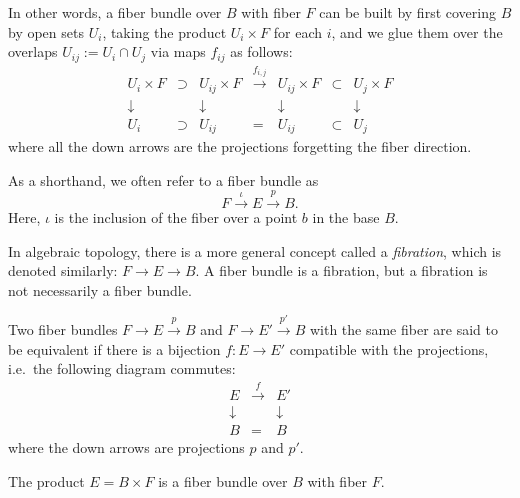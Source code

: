 \documentclass[12pt]{article}
\numberwithin{equation}{section}
\theoremstyle{remark}
\newtheorem{remark}[definition]{Remark}
\begin{document}
In other words, a fiber bundle over $B$ with fiber $F$
can be built by first covering $B$ by open sets $U_i$,
taking the product $U_i \times F$ for each $i$,
and we glue them over the overlaps $U_{ij}:=U_i\cap U_j$ via
maps $f_{ij}$ as follows:
\begin{equation}
  \begin{array}{cccccccc}
    U_i \times F &\supset& U_{ij}\times F & \xrightarrow{f_{i,j}} & 
    U_{ij}\times F & \subset & U_j\times F \\
    \downarrow & & \downarrow & & \downarrow & & \downarrow \\
    U_i & \supset & U_{ij} & = & U_{ij} & \subset & U_j
  \end{array}
\end{equation}
where all the down arrows are the projections forgetting the fiber direction.

\begin{notation}
  As a shorthand, we often refer to a fiber bundle as 
  \begin{equation}
  F\stackrel{\iota}{\longrightarrow} E\stackrel{p}{\longrightarrow} B.  
  \end{equation}  
  Here, $\iota$ is the inclusion of the fiber over a point $b$ in the base $B$.
\end{notation}

In algebraic topology, there is a more general concept called a \emph{fibration}, which is denoted similarly: $F\to E\to B$.
A fiber bundle is a fibration, but a fibration is not necessarily a fiber bundle.

\begin{definition}
  \label{def:bundle-equiv}
Two fiber bundles $F\to E\xrightarrow{p} B$ and $F\to E'\xrightarrow{p'} B$ with the same fiber
are said to be equivalent if there is a bijection $f: E\to E'$ 
compatible with the projections, i.e.~the following diagram commutes:
\begin{equation}
  \begin{array}{ccc}
    E & \xrightarrow{f} & E' \\
    \downarrow & & \downarrow \\
    B & = & B
  \end{array}
\end{equation}
where the down arrows are projections $p$ and $p'$.
\end{definition}

\begin{example}
  The product $E = B\times F$ is a fiber bundle over $B$ with fiber $F$.
\end{example}
\end{document}
